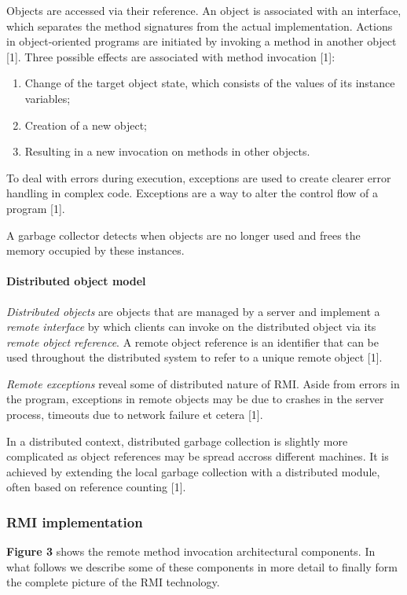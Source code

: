 Objects are accessed via their reference. An object is associated with an interface, which separates the method signatures from the actual implementation. Actions in object-oriented programs are initiated by invoking a method in another object [1]. Three possible effects are associated with method invocation [1]:
\begin{enumerate}
	\item Change of the target object state, which consists of the values of its instance variables;
	\item Creation of a new object;
	\item Resulting in a new invocation on methods in other objects.
\end{enumerate}
To deal with errors during execution, exceptions are used to create clearer error handling in complex code. Exceptions are a way to alter the control flow of a program [1].

A garbage collector detects when objects are no longer used and frees the memory occupied by these instances.

\paragraph{Distributed object model}

\emph{Distributed objects} are objects that are managed by a server and implement a \emph{remote interface} by which clients can invoke on the distributed object via its \emph{remote object reference}. A remote object reference is an identifier that can be used throughout the distributed system to refer to a unique remote object [1].

\emph{Remote exceptions} reveal some of distributed nature of RMI. Aside from errors in the program, exceptions in remote objects may be due to crashes in the server process, timeouts due to network failure et cetera [1].

In a distributed context, distributed garbage collection is slightly more complicated as object references may be spread accross different machines. It is achieved by extending the local garbage collection with a distributed module, often based on reference counting [1].


\subsubsection{RMI implementation}

\textbf{Figure 3} shows the remote method invocation architectural components. In what follows we describe some of these components in more detail to finally form the complete picture of the RMI technology.

